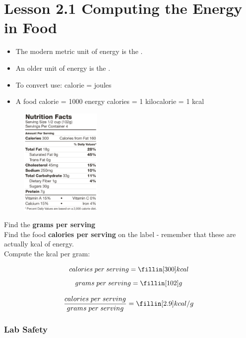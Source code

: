 \documentclass[answers,12pt]{exam}
\begin{document}
\section*{Lesson 2.1 Computing the Energy in Food}

\begin{itemize}
    \item The modern metric unit of energy is the \fillin[joule]. 
    \item An older unit of energy is the \fillin[calorie].
    \item To convert use: \fillin[1] calorie = \fillin[4.2] joules
    \item A food calorie = 1000 energy calories = 1 kilocalorie = 1 kcal
\end{itemize}
    

\begin{figure} %
    \centering
    \includegraphics[width=0.35\textwidth]{food_label.png}
\end{figure}


Find the \textbf{grams per serving} \\ 

Find the food \textbf{calories per serving} on the label - remember that these are actually kcal of energy. \\

Compute the kcal per gram:

$$ calories \; per \; serving = \fillin[300] kcal $$
$$ grams \; per \; serving = \fillin[102] g $$

$$ \frac{calories \; per \; serving}{grams \; per \; serving} = \fillin[2.9] kcal/g  $$


\vspace{.1cm}

\subsubsection*{Lab Safety}
\end{document}
